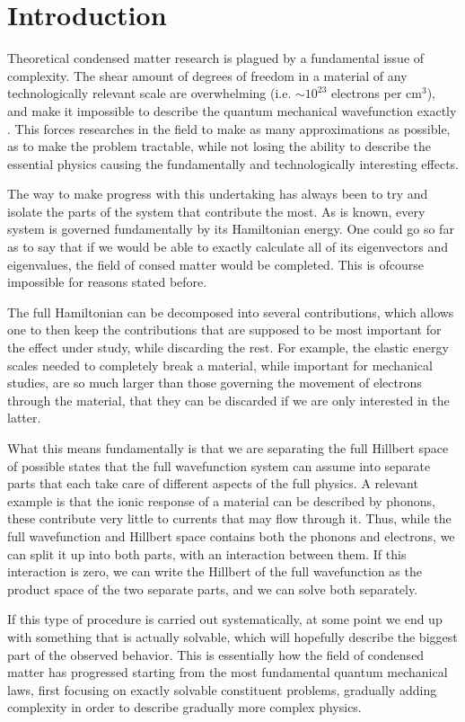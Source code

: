 \chapter{Introduction}
Theoretical condensed matter research is plagued by a fundamental issue of complexity. The shear amount of degrees of freedom in a material of any technologically relevant scale are overwhelming (i.e. $\sim10^{23}$ electrons per cm$^3$), and make it impossible to describe the quantum mechanical wavefunction exactly . This forces researches in the field to make as many approximations as possible, as to make the problem tractable, while not losing the ability to describe the essential physics causing the fundamentally and technologically interesting effects.

The way to make progress with this undertaking has always been to try and isolate the parts of the system that contribute the most. As is known, every system is governed fundamentally by its Hamiltonian energy. One could go so far as to say that if we would be able to exactly calculate all of its eigenvectors and eigenvalues, the field of consed matter would be completed. This is ofcourse impossible for reasons stated before.

The full Hamiltonian can be decomposed into several contributions, which allows one to then keep the contributions that are supposed to be most important for the effect under study, while discarding the rest. For example, the elastic energy scales needed to completely break a material, while important for mechanical studies, are so much larger than those governing the movement of electrons through the material, that they can be discarded if we are only interested in the latter.

What this means fundamentally is that we are separating the full Hillbert space of possible states that the full wavefunction system can assume into separate parts that each take care of different aspects of the full physics. A relevant example is that the ionic response of a material can be described by phonons, these contribute very little to currents that may flow through it. Thus, while the full wavefunction and Hillbert space contains both the phonons and electrons, we can split it up into both parts, with an interaction between them. If this interaction is zero, we can write the Hillbert of the full wavefunction as the product space of the two separate parts, and we can solve both separately.

If this type of procedure is carried out systematically, at some point we end up with something that is actually solvable, which will hopefully describe the biggest part of the observed behavior. This is essentially how the field of condensed matter has progressed starting from the most fundamental quantum mechanical laws, first focusing on exactly solvable constituent problems, gradually adding complexity in order to describe gradually more complex physics.

